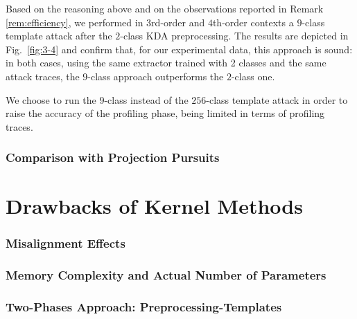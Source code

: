 Based on the reasoning above and on the observations reported in Remark \ref{rem:efficiency}, we performed in $3$rd-order and $4$th-order contexts a $9$-class template attack after the $2$-class KDA preprocessing.  The results are depicted in Fig.~\ref{fig:3-4} and confirm that, for our experimental data, this approach is sound: in both cases, using the same extractor trained with 2 classes and the same attack traces, the $9$-class approach outperforms the $2$-class one.
 
\begin{remark}
We choose to run the $9$-class instead of the $256$-class template attack in order to raise the accuracy of the profiling phase, being limited in terms of profiling traces. 
\end{remark}


\subsubsection{Comparison with Projection Pursuits}\label{sec:comparisonPP}


\section{Drawbacks of Kernel Methods}
\subsubsection{Misalignment Effects}
\subsubsection{Memory Complexity and Actual Number of Parameters}
\subsubsection{Two-Phases Approach: Preprocessing-Templates}
